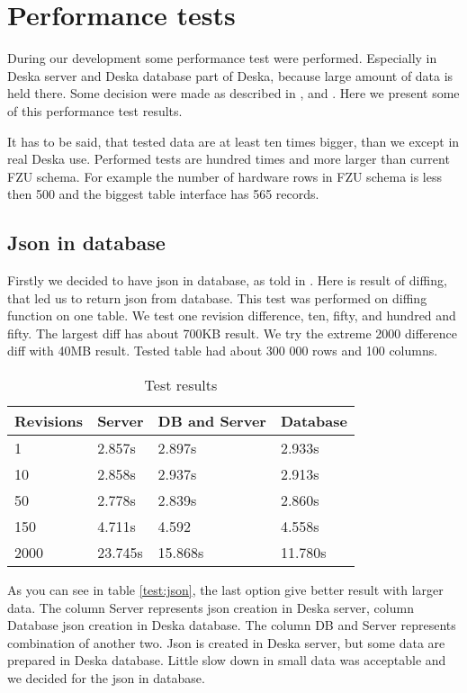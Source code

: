 \documentclass[deska]{subfiles}
\begin{document}
\section{Performance tests}
\label{sec:performance}

During our development some performance test were performed. Especially in Deska server and Deska database
part of Deska, because large amount of data is held there. Some decision were made as described in
,  and .
Here we present some of this performance test results.

It has to be said, that tested data are at least ten times bigger, than we
except in real Deska use. Performed tests are hundred times and more larger
than current FZU schema.
For example the number of hardware rows in FZU schema is less then 500 
and the biggest table interface has 565 records.

\subsection{Json in database}
\label{sec:test-json}
Firstly we decided to have json in database, as told in .
Here is result of diffing, that led us to
return json from database.
This test was performed on diffing function on one table.
We test one revision difference, ten, fifty, and hundred and fifty.
The largest diff has about 700KB result.
We try the extreme 2000 difference diff with 40MB result.
Tested table had about 300 000 rows and 100 columns.

\label{test:json}
\begin{longtable}{ l | l | l | l}
\caption{Test results}\\
Revisions & Server & DB and Server & Database \\
\hline
\endhead
1 & 2.857s & 2.897s & 2.933s \\
10 & 2.858s & 2.937s & 2.913s \\
50 & 2.778s & 2.839s & 2.860s \\
150 & 4.711s & 4.592 & 4.558s \\
2000 & 23.745s & 15.868s & 11.780s \\
\end{longtable}

As you can see in table \ref{test:json}, the last option give better result with larger data.
The column Server represents json creation in Deska server, column Database json creation in
Deska database. The column DB and Server represents combination of another two. Json is created
in Deska server, but some data are prepared in Deska database.
Little slow down in small data was acceptable and we decided for the json in database.
\end{document}
